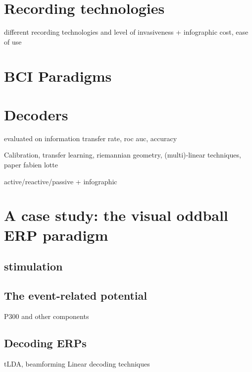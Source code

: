 
\section{Recording technologies}
\label{sec:bci-recording}
different recording technologies and level of invasiveness + infographic
cost, ease of use
\section{BCI Paradigms}
\label{sec:bci-paradigms}

\section{Decoders}
\label{sec:bci-decoders}
evaluated on
information transfer rate,
roc auc,
accuracy

Calibration, transfer learning, riemannian geometry, (multi)-linear techniques,
paper fabien lotte

active/reactive/passive + infographic


\section{A case study: the visual oddball ERP paradigm}
\subsection{stimulation}
\subsection{The event-related potential}
P300 and other components
\subsection{Decoding ERPs}
tLDA, beamforming
Linear decoding techniques
